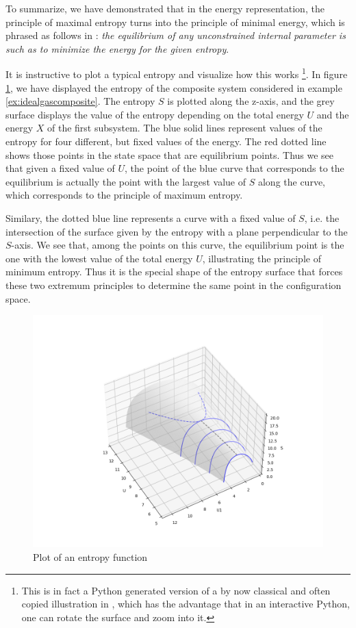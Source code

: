 \documentclass[a4paper, draft]{report}
\numberwithin{section}{chapter}
\numberwithin{equation}{chapter}
\theoremstyle{own}
\theoremstyle{remark}
\begin{document}
To summarize, we have demonstrated that in the energy representation, the principle of maximal entropy turns into the principle of minimal energy, which is phrased as follows in \cite{Callen}: {\em the equilibrium of any unconstrained internal parameter is such as to minimize the energy for the given entropy}. 

It is instructive to plot a typical entropy and visualize how this works
\footnote{
This is in fact a Python generated version of a by now classical and often copied illustration in \cite{Callen}, which has the advantage that in an interactive Python, one can rotate the surface and zoom into it.
}. In figure \ref{fig:EntropyPlot}, we have displayed the entropy of the composite system considered in example \ref{ex:idealgascomposite}. The entropy $S$ is plotted along the z-axis, and the grey surface displays the value of the entropy depending on the total energy $U$ and the energy $X$ of the first subsystem. The blue solid lines represent values of the entropy for four different, but fixed values of the energy. The red dotted line shows those points in the state space that are equilibrium points. Thus we see that given a fixed value of $U$, the point of the blue curve that corresponds to the equilibrium is actually the point with the largest value of $S$ along the curve, which corresponds to the principle of maximum entropy.

Similary, the dotted blue line represents a curve with a fixed value of $S$, i.e. the intersection of the surface given by the entropy with a plane perpendicular to the $S$-axis. We see that, among the points on this curve, the equilibrium point is the one with the lowest value of the total energy $U$, illustrating the principle of minimum entropy. Thus it is the special shape of the entropy surface that forces these two extremum principles to determine the same point in the configuration space.


\begin{figure}[ht]
\includegraphics[scale=0.5]{EntropyPlot}
\caption{Plot of an entropy function}
\label{fig:EntropyPlot}
\end{figure}
\end{document}
